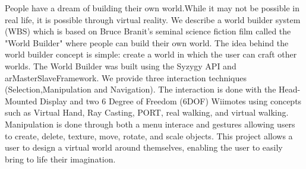People have a dream of building their own world.While it may not be possible in real life, it is possible through virtual reality.
We describe a world builder system (WBS) which is based on Bruce Branit's seminal science fiction film called the "World Builder" where people can build their own world.
The idea behind the world builder concept is simple: create a world in which the user can craft other worlds.
The World Builder was built using the Syzygy API and arMasterSlaveFramework.
We provide three interaction techniques (Selection,Manipulation and Navigation).
The interaction is done with the Head-Mounted Display and two 6 Degree of Freedom (6DOF) Wiimotes using concepts such as Virtual Hand, Ray Casting, PORT, real walking, and virtual walking.
Manipulation is done through both a menu interace and gestures allowing users to create, delete, texture, move, rotate, and scale objects.
This project allows a user to design a virtual world around themselves, enabling the user to easily bring to life their imagination.

